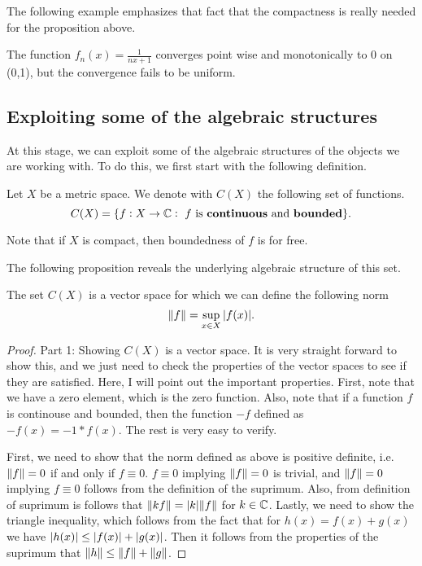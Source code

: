 The following example emphasizes that fact that the compactness is really needed for the proposition above.

\begin{example}
	The function $ f_n(x)= \frac{1}{nx + 1}$ converges point wise and monotonically to $ 0 $ on (0,1), but the convergence fails to be uniform.
\end{example}

\subsection{Exploiting some of the algebraic structures}
At this stage, we can exploit some of the algebraic structures of the objects we are working with. To do this, we first start with the following definition.

\begin{definition}
	Let $ X $ be a metric space. We denote with $ C(X) $ the following set of functions.
	\[ C(X) = \{f: X\to \mathbb{C}:\ f \text{ is \textbf{continuous} and \textbf{bounded}}\}. \]
\end{definition}
\begin{remark}
	Note that if $ X $ is compact, then boundedness of $ f $ is for free.
\end{remark}

The following proposition reveals the underlying algebraic structure of this set. 

\begin{proposition}
	The set $ C(X) $ is a vector space for which we can define the following norm
	\[ \norm{f} = \sup_{x\in X}|f(x)|. \]
\end{proposition}
\begin{proof}
	{\color{orange} Part 1: Showing $ C(X) $ is a vector space.  }
	It is very straight forward to show this, and we just need to check the properties of the vector spaces to see if they are satisfied. Here, I will point out the important properties. First, note that we have a zero element, which is the zero function. Also, note that if a function $ f $ is continouse and bounded, then the function $ -f $ defined as $ -f(x) =  -1 * f(x) $. The rest is very easy to verify.
	
	First, we need to show that the norm defined as above is positive definite, i.e. $ \norm{f}=0 $ if and only if $ f\equiv 0 $. $ f\equiv0 $ implying $ \norm{f} = 0 $ is trivial, and $ \norm{f} = 0 $ implying $ f\equiv0 $ follows from the definition of the suprimum. Also, from definition of suprimum is follows that $ \norm{kf} = |k|\norm{f} $ for $ k \in \mathbb{C} $. Lastly, we need to show the triangle inequality, which follows from the fact that for $ h(x) = f(x) + g(x) $ we have $ |h(x)|  \leq |f(x)| + |g(x)|$. Then it follows from the properties of the suprimum that $ \norm{h} \leq \norm{f} + \norm{g} $.
\end{proof}

